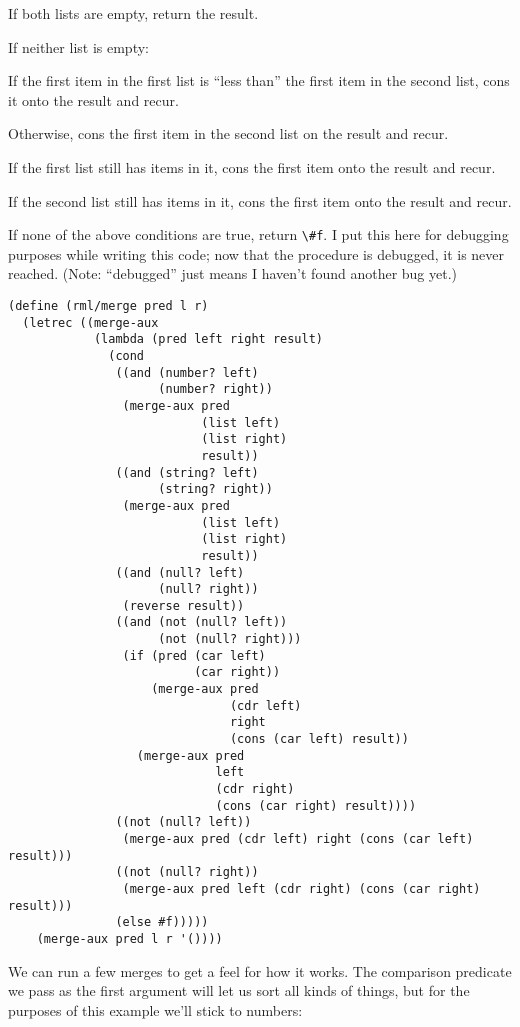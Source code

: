 \documentclass[12pt,openright,draft]{book}
\begin{document}
If both lists are empty, return the result.

If neither list is empty:

If the first item in the first list is ``less than'' the first item in
the second list, cons it onto the result and recur.

Otherwise, cons the first item in the second list on the result and
recur.

If the first list still has items in it, cons the first item onto the
result and recur.

If the second list still has items in it, cons the first item onto the
result and recur.

If none of the above conditions are true, return \verb|\#f|. I put
this here for debugging purposes while writing this code; now that the
procedure is debugged, it is never reached. (Note: ``debugged'' just
means I haven't found another bug yet.)

\begin{verbatim}
(define (rml/merge pred l r)
  (letrec ((merge-aux
            (lambda (pred left right result)
              (cond
               ((and (number? left)
                     (number? right))
                (merge-aux pred
                           (list left)
                           (list right)
                           result))
               ((and (string? left)
                     (string? right))
                (merge-aux pred
                           (list left)
                           (list right)
                           result))
               ((and (null? left)
                     (null? right))
                (reverse result))
               ((and (not (null? left))
                     (not (null? right)))
                (if (pred (car left)
                          (car right))
                    (merge-aux pred
                               (cdr left)
                               right
                               (cons (car left) result))
                  (merge-aux pred
                             left
                             (cdr right)
                             (cons (car right) result))))
               ((not (null? left))
                (merge-aux pred (cdr left) right (cons (car left) result)))
               ((not (null? right))
                (merge-aux pred left (cdr right) (cons (car right) result)))
               (else #f)))))
    (merge-aux pred l r '())))
\end{verbatim}

We can run a few merges to get a feel for how it works. The comparison
predicate we pass as the first argument will let us sort all kinds of
things, but for the purposes of this example we'll stick to numbers:
\end{document}
